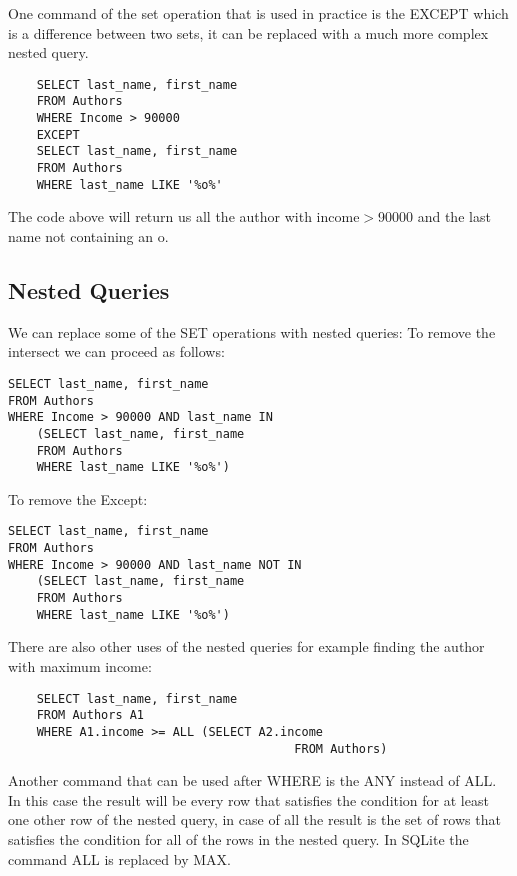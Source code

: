\documentclass[a4page, 11pt]{article}
\begin{document}
One command of the set operation that is used in practice is the EXCEPT which is a difference between two sets, it can be replaced with a much more complex nested query.
\begin{lstlisting}
	SELECT last_name, first_name
	FROM Authors
	WHERE Income > 90000
	EXCEPT 
	SELECT last_name, first_name
	FROM Authors
	WHERE last_name LIKE '%o%' 
\end{lstlisting}
The code above will return us all the author with income$>$90000 and the last name not containing an o.

\subsection{Nested Queries}
We can replace some of the SET operations with nested queries:\newline
To remove the intersect we can proceed as follows:
\begin{lstlisting}
SELECT last_name, first_name
FROM Authors
WHERE Income > 90000 AND last_name IN 
	(SELECT last_name, first_name
	FROM Authors
	WHERE last_name LIKE '%o%')
\end{lstlisting}

To remove the Except:
\begin{lstlisting}
SELECT last_name, first_name
FROM Authors
WHERE Income > 90000 AND last_name NOT IN 
	(SELECT last_name, first_name
	FROM Authors
	WHERE last_name LIKE '%o%')
\end{lstlisting}
There are also other uses of the nested queries for example finding the author with maximum income:
\begin{lstlisting}
	SELECT last_name, first_name
	FROM Authors A1
	WHERE A1.income >= ALL (SELECT A2.income
										FROM Authors)
\end{lstlisting}
Another command that can be used after WHERE is the ANY instead of ALL. In this case the result will be every row that satisfies the condition for at least one other row of the nested query, in case of all the result is the set of rows that satisfies the condition for all of the rows in the nested query. In SQLite the command ALL is replaced by MAX.
\end{document}
